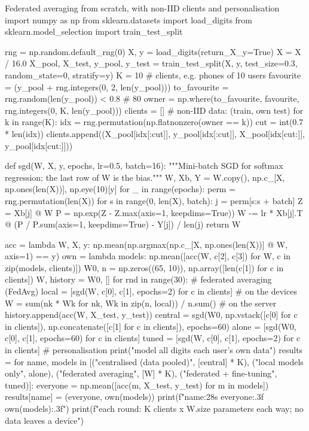 \begin{pylisting}[label={lst:fedavg}]{Federated averaging from scratch, with non-IID clients and personalisation}
import numpy as np
from sklearn.datasets import load_digits
from sklearn.model_selection import train_test_split

rng = np.random.default_rng(0)
X, y = load_digits(return_X_y=True)
X = X / 16.0
X_pool, X_test, y_pool, y_test = train_test_split(X, y, test_size=0.3, random_state=0,
                                                  stratify=y)
K = 10                                             # clients, e.g. phones of 10 users
favourite = (y_pool + rng.integers(0, 2, len(y_pool))) %
to_favourite = rng.random(len(y_pool)) < 0.8                 # 80%
owner = np.where(to_favourite, favourite, rng.integers(0, K, len(y_pool)))
clients = []                                       # non-IID data: (train, own test)
for k in range(K):
    idx = rng.permutation(np.flatnonzero(owner == k))
    cut = int(0.7 * len(idx))
    clients.append((X_pool[idx[:cut]], y_pool[idx[:cut]],
                    X_pool[idx[cut:]], y_pool[idx[cut:]]))

def sgd(W, X, y, epochs, lr=0.5, batch=16):
    """Mini-batch SGD for softmax regression; the last row of W is the bias."""
    W, Xb, Y = W.copy(), np.c_[X, np.ones(len(X))], np.eye(10)[y]
    for _ in range(epochs):
        perm = rng.permutation(len(X))
        for s in range(0, len(X), batch):
            j = perm[s:s + batch]
            Z = Xb[j] @ W
            P = np.exp(Z - Z.max(axis=1, keepdims=True))
            W -= lr * Xb[j].T @ (P / P.sum(axis=1, keepdims=True) - Y[j]) / len(j)
    return W

acc = lambda W, X, y: np.mean(np.argmax(np.c_[X, np.ones(len(X))] @ W, axis=1) == y)
own = lambda models: np.mean([acc(W, c[2], c[3]) for W, c in zip(models, clients)])
W0, n = np.zeros((65, 10)), np.array([len(c[1]) for c in clients])
W, history = W0, []
for rnd in range(30):                              # federated averaging (FedAvg)
    local = [sgd(W, c[0], c[1], epochs=2) for c in clients]      # on the devices
    W = sum(nk * Wk for nk, Wk in zip(n, local)) / n.sum()       # on the server
    history.append(acc(W, X_test, y_test))
central = sgd(W0, np.vstack([c[0] for c in clients]),
              np.concatenate([c[1] for c in clients]), epochs=60)
alone = [sgd(W0, c[0], c[1], epochs=60) for c in clients]
tuned = [sgd(W, c[0], c[1], epochs=2) for c in clients]          # personalisation
print("model                        all digits   each user's own data")
results = {}
for name, models in [("centralised (data pooled)", [central] * K),
                     ("local models only", alone), ("federated averaging", [W] * K),
                     ("federated + fine-tuning", tuned)]:
    everyone = np.mean([acc(m, X_test, y_test) for m in models])
    results[name] = (everyone, own(models))
    print(f"{name:28s}    {everyone:.3f}          {own(models):.3f}")
print(f"each round: {K} clients x {W.size} parameters each way; no data leaves a device")
\end{pylisting}
